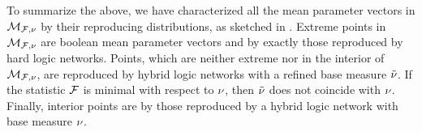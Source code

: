To summarize the above, we have characterized all the mean parameter vectors in $\mathcal{M}_{\mathcal{F},\nu}$ by their reproducing distributions, as sketched in .
Extreme points in $\mathcal{M}_{\mathcal{F},\nu}$ are boolean mean parameter vectors and by  exactly those reproduced by hard logic networks.
Points, which are neither extreme nor in the interior of $\mathcal{M}_{\mathcal{F},\nu}$, are reproduced by hybrid logic networks with a refined base measure $\tilde{\nu}$. %
If the statistic $\mathcal{F}$ is minimal with respect to $\nu$, then $\tilde{\nu}$ does not coincide with $\nu$.
Finally, interior points are by  those reproduced by a hybrid logic network with base measure $\nu$.


